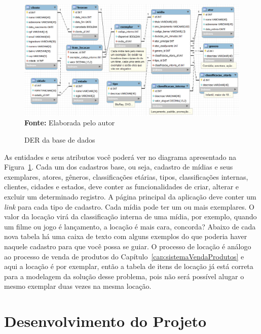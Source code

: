 \FloatBarrier
\begin{figure}[!htbp]
    \centering
    \caption{DER da base de dados}
    \includegraphics[scale=0.45]{imagens/cap09DER}
    \\\textbf{Fonte:} Elaborada pelo autor
    \label{fig:cap09DER}
\end{figure}
\FloatBarrier

As entidades e seus atributos você poderá ver no diagrama apresentado na Figura~\ref{fig:cap09DER}. Cada um dos cadastros base, ou seja, cadastro de mídias e seus exemplares, atores, gêneros, classificações etárias, tipos, classificações internas, clientes, cidades e estados, deve conter as funcionalidades de criar, alterar e excluir um determinado registro. A página principal da aplicação deve conter um \textit{link} para cada tipo de cadastro. Cada mídia pode ter um ou mais exemplares. O valor da locação virá da classificação interna de uma mídia, por exemplo, quando um filme ou jogo é lançamento, a locação é mais cara, concorda? Abaixo de cada nova tabela há uma caixa de texto com alguns exemplos do que poderia haver naquele cadastro para que você possa se guiar. O processo de locação é análogo ao processo de venda de produtos do Capítulo~\ref{cap:sistemaVendaProdutos} e aqui a locação é por exemplar, então a tabela de itens de locação já está correta para a modelagem da solução desse problema, pois não será possível alugar o mesmo exemplar duas vezes na mesma locação.


\section{Desenvolvimento do Projeto}

